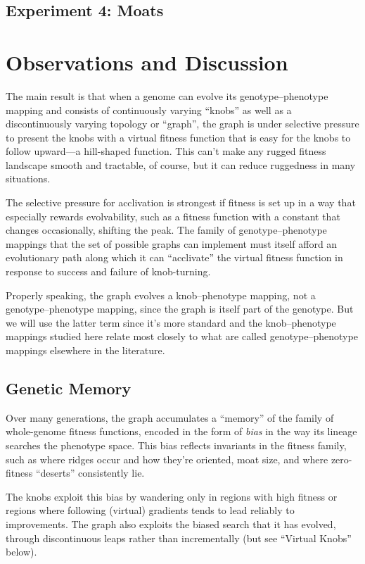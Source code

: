 \documentclass[letterpaper]{article}
\begin{document}
\subsection{Experiment 4: Moats}

\section{Observations and Discussion}

The main result is that when a genome can evolve its genotype--phenotype
mapping and consists of continuously varying ``knobs'' as well as a
discontinuously varying topology or ``graph'', the graph is under selective
pressure to present the knobs with a virtual fitness function that is easy for
the knobs to follow upward---a hill-shaped function. This can't make any
rugged fitness landscape smooth and tractable, of course, but it can reduce
ruggedness in many situations.

The selective pressure for acclivation is strongest if fitness is set up in a
way that especially rewards evolvability, such as a fitness function with a
constant that changes occasionally, shifting the peak. The family of
genotype--phenotype mappings that the set of possible graphs can implement must
itself afford an evolutionary path along which it can ``acclivate'' the virtual
fitness function in response to success and failure of knob-turning.

Properly speaking, the graph evolves a knob--phenotype mapping, not a
genotype--phenotype mapping, since the graph is itself part of the genotype.
But we will use the latter term since it's more standard and the
knob--phenotype mappings studied here relate most closely to what are called
genotype--phenotype mappings elsewhere in the literature.

\subsection{Genetic Memory}

Over many generations, the graph accumulates a ``memory'' of the family of
whole-genome fitness functions, encoded in the form of \textit{bias} in the way
its lineage searches the phenotype space. This bias reflects invariants in the
fitness family, such as where ridges occur and how they're oriented, moat size,
and where zero-fitness ``deserts'' consistently lie.

The knobs exploit this bias by wandering only in regions with high fitness or
regions where following (virtual) gradients tends to lead reliably to
improvements. The graph also exploits the biased search that it has evolved,
through discontinuous leaps rather than incrementally (but see ``Virtual
Knobs'' below).
\end{document}
